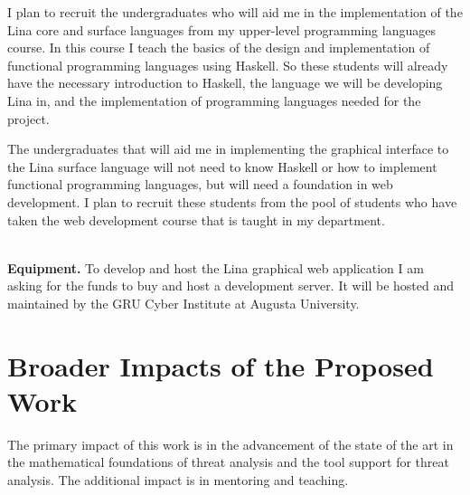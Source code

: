 \begin{full}
I plan to recruit the undergraduates who will aid me in the
implementation of the Lina core and surface languages from my
upper-level programming languages course.  In this course I teach the
basics of the design and implementation of functional programming
languages using Haskell.  So these students will already have the
necessary introduction to Haskell, the language we will be developing
Lina in, and the implementation of programming languages needed for
the project.

The undergraduates that will aid me in implementing the graphical
interface to the Lina surface language will not need to know Haskell
or how to implement functional programming languages, but will need a
foundation in web development.  I plan to recruit these students from
the pool of students who have taken the web development course that is
taught in my department.

\ \\
\noindent
\textbf{Equipment.}  To develop and host the Lina graphical web
application I am asking for the funds to buy and host a development
server.  It will be hosted and maintained by the GRU Cyber Institute
at Augusta University.


\section{Broader Impacts of the Proposed Work}
\label{sec:broader_impacts_of_the_proposed_work}

The primary impact of this work is in the advancement of the state of
the art in the mathematical foundations of threat analysis and the
tool support for threat analysis.  The additional impact is in
mentoring and teaching.


\end{full}
